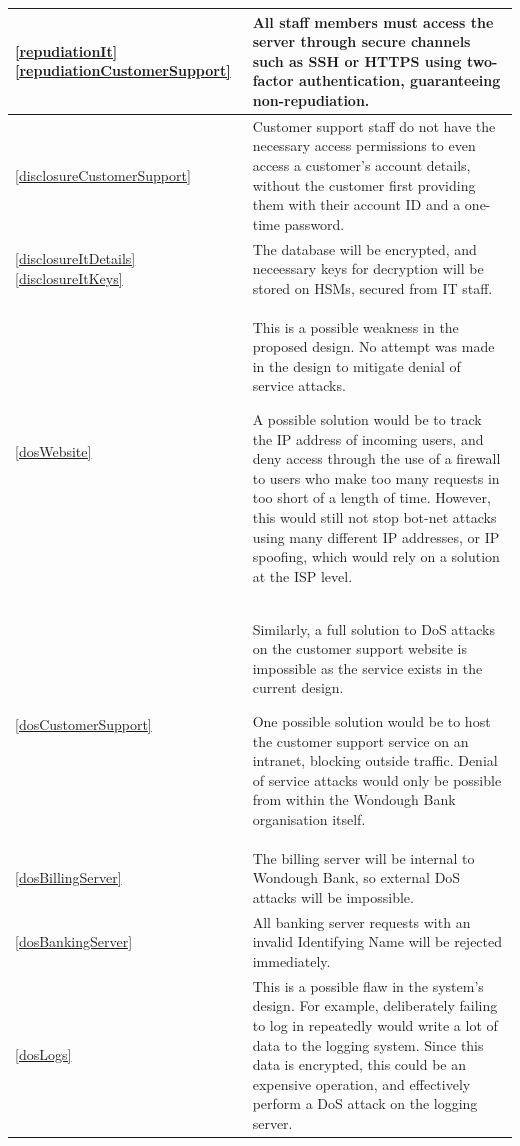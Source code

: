 \begin{longtable}{|| p{} | p{} ||}
    \\ \hline \ref{repudiationIt} \ref{repudiationCustomerSupport} &
        All staff members must access the server through secure channels such as SSH or HTTPS using two-factor authentication, guaranteeing non-repudiation. 
    \\ \hline \ref{disclosureCustomerSupport} &
        Customer support staff do not have the necessary access permissions to even access a customer's account details, without the customer first providing them with their account ID and a one-time password.
    \\ \hline \ref{disclosureItDetails} \ref{disclosureItKeys} &
        The database will be encrypted, and neceessary keys for decryption will be stored on HSMs, secured from IT staff.
    \\ \hline \textcolor{red}{\ref{dosWebsite}} &
        This is a possible weakness in the proposed design. No attempt was made in the design to mitigate denial of service attacks.

        A possible solution would be to track the IP address of incoming users, and deny access through the use of a firewall to users who make too many requests in too short of a length of time. However, this would still not stop bot-net attacks using many different IP addresses, or IP spoofing, which would rely on a solution at the ISP level.
    \\ \hline \textcolor{red}{\ref{dosCustomerSupport}} &
        Similarly, a full solution to DoS attacks on the customer support website is impossible as the service exists in the current design.

        One possible solution would be to host the customer support service on an intranet, blocking outside traffic. Denial of service attacks would only be possible from within the Wondough Bank organisation itself.
    \\ \hline \ref{dosBillingServer} &
        The billing server will be internal to Wondough Bank, so external DoS attacks will be impossible. 
    \\ \hline \ref{dosBankingServer} &
        All banking server requests with an invalid Identifying Name will be rejected immediately.
    \\ \hline \textcolor{red}{\ref{dosLogs}} &
        This is a possible flaw in the system's design. For example, deliberately failing to log in repeatedly would write a lot of data to the logging system. Since this data is encrypted, this could be an expensive operation, and effectively perform a DoS attack on the logging server.


\end{longtable}
